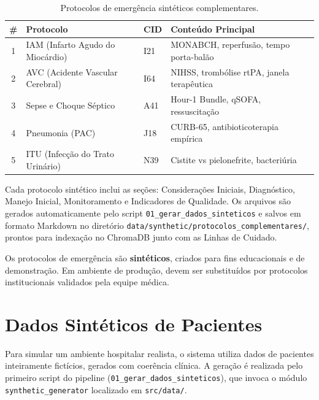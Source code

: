 \begin{table}[H]
\centering
\caption{Protocolos de emergência sintéticos complementares.}
\label{tab:protocolos_emergencia}
\begin{tabularx}{\textwidth}{c l l X}
\toprule
\textbf{\#} & \textbf{Protocolo} & \textbf{CID} & \textbf{Conteúdo Principal} \\
\midrule
1 & IAM (Infarto Agudo do Miocárdio) & I21 & MONABCH, reperfusão, tempo porta-balão \\
2 & AVC (Acidente Vascular Cerebral) & I64 & NIHSS, trombólise rtPA, janela terapêutica \\
3 & Sepse e Choque Séptico & A41 & Hour-1 Bundle, qSOFA, ressuscitação \\
4 & Pneumonia (PAC) & J18 & CURB-65, antibioticoterapia empírica \\
5 & ITU (Infecção do Trato Urinário) & N39 & Cistite vs pielonefrite, bacteriúria \\
\bottomrule
\end{tabularx}
\end{table}

Cada protocolo sintético inclui as seções: Considerações Iniciais, Diagnóstico, Manejo Inicial, Monitoramento e Indicadores de Qualidade. Os arquivos são gerados automaticamente pelo script \texttt{01\_gerar\_dados\_sinteticos} e salvos em formato Markdown no diretório \texttt{data/synthetic/protocolos\_complementares/}, prontos para indexação no ChromaDB junto com as Linhas de Cuidado.

\begin{warningbox}
Os protocolos de emergência são \textbf{sintéticos}, criados para fins educacionais e de demonstração. Em ambiente de produção, devem ser substituídos por protocolos institucionais validados pela equipe médica.
\end{warningbox}

\section{Dados Sintéticos de Pacientes}

Para simular um ambiente hospitalar realista, o sistema utiliza dados de pacientes inteiramente fictícios, gerados com coerência clínica. A geração é realizada pelo primeiro script do pipeline (\texttt{01\_gerar\_dados\_sinteticos}), que invoca o módulo \texttt{synthetic\_generator} localizado em \texttt{src/data/}.

